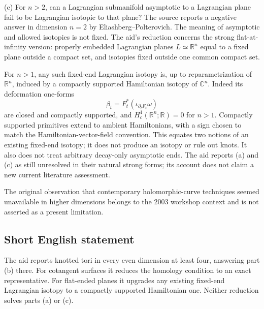 \documentclass[11pt]{article}
\newcommand{\R}{\mathbb{R}}
\newcommand{\C}{\mathbb{C}}
\begin{document}
(c) For \(n>2\), can a Lagrangian submanifold asymptotic to a Lagrangian plane fail to be Lagrangian isotopic to that plane? The source reports a negative answer in dimension \(n=2\) by Eliashberg--Polterovich. The meaning of asymptotic and allowed isotopies is not fixed. The aid's reduction concerns the strong flat-at-infinity version: properly embedded Lagrangian planes \(L\simeq\R^n\) equal to a fixed plane outside a compact set, and isotopies fixed outside one common compact set.

For \(n>1\), any such fixed-end Lagrangian isotopy is, up to reparametrization of \(\R^n\), induced by a compactly supported Hamiltonian isotopy of \(\C^n\). Indeed its deformation one-forms
\[
 \beta_t=F_t^*(\iota_{\partial_tF_t}\omega)
\]
are closed and compactly supported, and \(H_c^1(\R^n;\R)=0\) for \(n>1\). Compactly supported primitives extend to ambient Hamiltonians, with a sign chosen to match the Hamiltonian-vector-field convention. This equates two notions of an existing fixed-end isotopy; it does not produce an isotopy or rule out knots. It also does not treat arbitrary decay-only asymptotic ends. The aid reports (a) and (c) as still unresolved in their natural strong forms; its account does not claim a new current literature assessment.

The original observation that contemporary holomorphic-curve techniques seemed unavailable in higher dimensions belongs to the 2003 workshop context and is not asserted as a present limitation.
\subsection{Short English statement}
The aid reports knotted tori in every even dimension at least four, answering part (b) there. For cotangent surfaces it reduces the homology condition to an exact representative. For flat-ended planes it upgrades any existing fixed-end Lagrangian isotopy to a compactly supported Hamiltonian one. Neither reduction solves parts (a) or (c).
\end{document}
